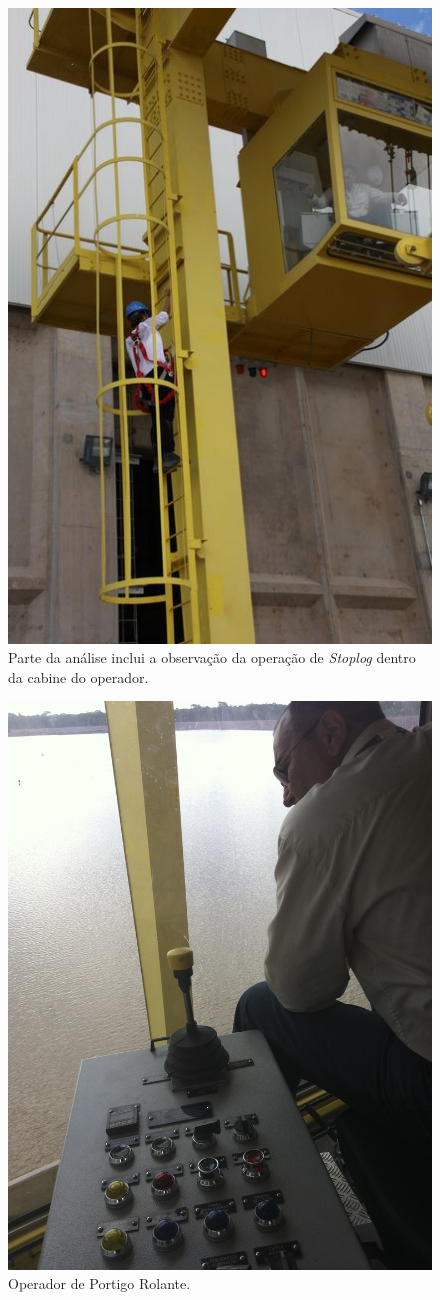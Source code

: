 \begin{figure}[h!]
    \centering \includegraphics[scale=0.6]{figs/jirau/jirau_17}
    \caption{Parte da análise inclui a observação da operação de \emph{Stoplog} dentro da cabine do operador.}
    \label{fig:jirau17}
\end{figure}

\begin{figure}[h!]
    \centering \includegraphics[width=0.6\columnwidth]{figs/jirau/jirau_18}
    \caption{Operador de Portigo Rolante.}
    \label{fig:jirau18}
\end{figure}

